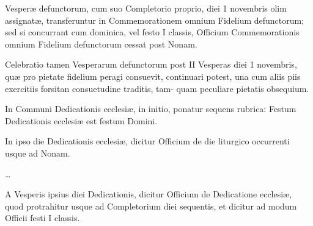\documentclass[vesperale_romanum.tex]{subfiles}
\begin{document}
Vesperæ defunctorum, cum suo Completorio proprio, diei 1 novembris olim assignatæ, transferuntur in Commemorationem omnium Fidelium defunctorum; sed si concurrant cum dominica, vel festo I classis, Officium Commemorationis omnium Fidelium defunctorum cessat post Nonam.
 
Celebratio tamen Vesperarum defunctorum post II Vesperas diei 1 novembris, quæ pro pietate fidelium peragi consuevit, continuari potest, una cum aliis piis exercitiis forsitan consuetudine traditis, tam- quam peculiare pietatis obsequium.



In Communi Dedicationis ecclesiæ, in initio, ponatur sequens rubrica: Festum Dedicationis ecclesiæ est festum Domini.

In ipso die Dedicationis ecclesiæ, dicitur Officium de die liturgico occurrenti usque ad Nonam.

…

A Vesperis ipsius diei Dedicationis, dicitur Officium de Dedicatione ecclesiæ, quod protrahitur usque ad Completorium diei sequentis, et dicitur ad modum Officii festi I classis.
\end{document}
